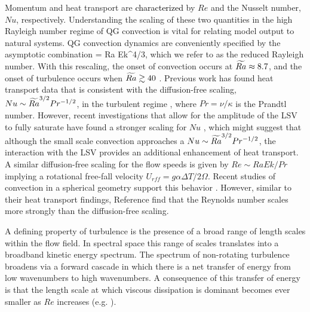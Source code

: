 Momentum and heat transport are \textcolor{black}{characterized} by $Re$ and the Nusselt number, $Nu$, respectively. Understanding the scaling of these two quantities in the high Rayleigh number regime of QG convection is vital for relating model output to natural systems.
QG convection dynamics are conveniently specified by the asymptotic combination 
\be
\Rat = Ra Ek^{4/3},
\ee
which we refer to as the reduced Rayleigh number. With this rescaling, the onset of convection occurs at $\widetilde{Ra} \approx 8.7$, and the onset of turbulence occurs when $\widetilde{Ra} \gtrsim 40$  \citep{kJ12}. Previous work has found heat transport data that is consistent with the diffusion-free scaling, $Nu \sim \widetilde{Ra}^{3/2}Pr^{-1/2}$, in the turbulent regime \citep{kJ12b,tG16}, where $Pr=\nu/\kappa$ is the Prandtl number. 
However, recent investigations that allow for the amplitude of the LSV to fully saturate have found a stronger scaling for $Nu$ \citep{sM21}, which might suggest that although the small scale convection approaches a $Nu \sim \widetilde{Ra}^{3/2}Pr^{-1/2}$, the interaction with the LSV provides an additional enhancement of heat transport.
A similar diffusion-free scaling for the flow speeds is given by $Re \sim Ra Ek/Pr$ implying a rotational free-fall velocity  $U_{r\!f\!f} = g \alpha \Delta T/2\Omega$.  Recent studies of convection in a spherical geometry support this behavior \citep{cG19}. However, similar to their heat transport findings, Reference \cite{sM21} find that the Reynolds number scales more strongly than the diffusion-free scaling. 


A defining property of turbulence is the presence 
of a broad range of length scales within the flow field. In spectral space this range of scales translates into a broadband kinetic energy spectrum. 
The spectrum of non-rotating turbulence broadens via a forward cascade in which there is a net transfer of energy from low wavenumbers to high wavenumbers. A consequence of this transfer of energy is that the length scale at which viscous dissipation is dominant becomes ever smaller as $Re$ increases (e.g. \citep{sP00}). 

